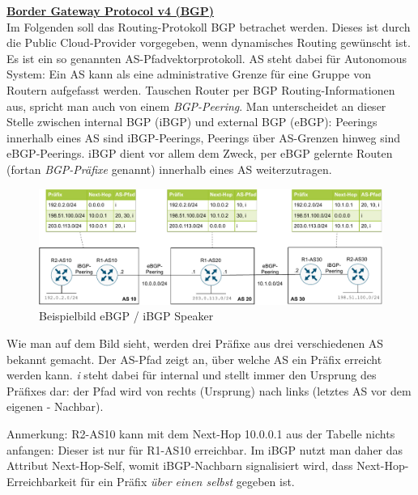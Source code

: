 \textbf{\underline{Border Gateway Protocol v4 (BGP)}}\\
Im Folgenden soll das Routing-Protokoll BGP betrachet werden. Dieses ist durch die Public Cloud-Provider vorgegeben, wenn dynamisches Routing gewünscht ist. Es ist ein so genannten AS-Pfadvektorprotokoll. AS steht dabei für Autonomous System: Ein AS kann als eine administrative \glqq Grenze\grqq{} für eine Gruppe von Routern aufgefasst werden. Tauschen Router per BGP Routing-Informationen aus, spricht man auch von einem \textit{BGP-Peering}. Man unterscheidet an dieser Stelle zwischen internal BGP (iBGP) und external BGP (eBGP): Peerings innerhalb eines AS sind iBGP-Peerings, Peerings über AS-Grenzen hinweg sind eBGP-Peerings. iBGP dient vor allem dem Zweck, per eBGP gelernte Routen (fortan \textit{BGP-Präfixe} genannt) innerhalb eines AS weiterzutragen.

\begin{figure}[h]
  \centering
  \includegraphics[scale=0.8]{Figures/ebgp_peerings.pdf}
  \caption{Beispielbild eBGP / iBGP Speaker}
  \label{grafik: ebgp_peerings}
\end{figure}\FloatBarrier

Wie man auf dem Bild sieht, werden drei Präfixe aus drei verschiedenen AS bekannt gemacht. Der AS-Pfad zeigt an, über welche AS ein Präfix erreicht werden kann. \textit{i} steht dabei für internal und stellt immer den Ursprung des Präfixes dar: der Pfad wird von rechts (Ursprung) nach links (letztes AS vor dem eigenen - \glqq Nachbar\grqq).\cite{odom2010}

Anmerkung: R2-AS10 kann mit dem Next-Hop 10.0.0.1 aus der Tabelle nichts anfangen: Dieser ist nur für R1-AS10 erreichbar. Im iBGP nutzt man daher das Attribut Next-Hop-Self, womit iBGP-Nachbarn signalisiert wird, dass Next-Hop-Erreichbarkeit für ein Präfix \textit{über einen selbst} gegeben ist.\cite[S.468-471]{odom2010}

